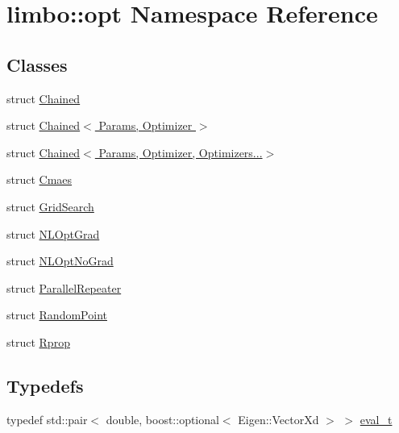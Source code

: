 \hypertarget{namespacelimbo_1_1opt}{}\section{limbo\+:\+:opt Namespace Reference}
\label{namespacelimbo_1_1opt}
\subsection*{Classes}
\begin{DoxyCompactItemize}
\item 
struct \hyperlink{structlimbo_1_1opt_1_1_chained}{Chained}
\item 
struct \hyperlink{structlimbo_1_1opt_1_1_chained_3_01_params_00_01_optimizer_01_4}{Chained$<$ Params, Optimizer $>$}
\item 
struct \hyperlink{structlimbo_1_1opt_1_1_chained_3_01_params_00_01_optimizer_00_01_optimizers_8_8_8_4}{Chained$<$ Params, Optimizer, Optimizers...$>$}
\item 
struct \hyperlink{structlimbo_1_1opt_1_1_cmaes}{Cmaes}
\item 
struct \hyperlink{structlimbo_1_1opt_1_1_grid_search}{Grid\+Search}
\item 
struct \hyperlink{structlimbo_1_1opt_1_1_n_l_opt_grad}{N\+L\+Opt\+Grad}
\item 
struct \hyperlink{structlimbo_1_1opt_1_1_n_l_opt_no_grad}{N\+L\+Opt\+No\+Grad}
\item 
struct \hyperlink{structlimbo_1_1opt_1_1_parallel_repeater}{Parallel\+Repeater}
\item 
struct \hyperlink{structlimbo_1_1opt_1_1_random_point}{Random\+Point}
\item 
struct \hyperlink{structlimbo_1_1opt_1_1_rprop}{Rprop}
\end{DoxyCompactItemize}
\subsection*{Typedefs}
\begin{DoxyCompactItemize}
\item 
typedef std\+::pair$<$ double, boost\+::optional$<$ Eigen\+::\+Vector\+Xd $>$ $>$ \hyperlink{group__opt__tools_ga7fc87080ebf563d050fc547d25528ef0}{eval\+\_\+t}
\end{DoxyCompactItemize}
